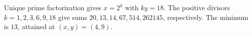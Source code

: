 Unique prime factorization gives $x=2^k$ with $ky=18$. The positive divisors $k=1,2,3,6,9,18$ give sums $20,13,14,67,514,262145$, respectively. The minimum is $\boxed{13}$, attained at $(x,y)=(4,9)$.
